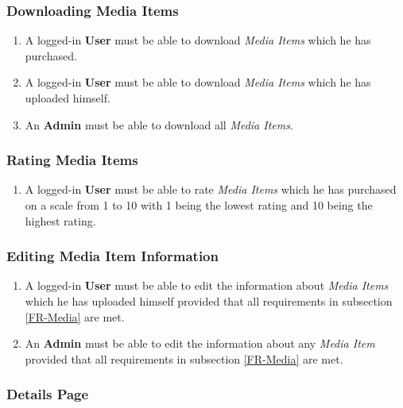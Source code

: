 \subsubsection {Downloading Media Items}

\begin{enumerate}[label=\textbf{FR-\twodigits*}, resume]
	\item A logged-in \textbf{User} must be able to download \textit{Media Items} which he has purchased.
	\item A logged-in \textbf{User} must be able to download \textit{Media Items} which he has uploaded himself.
	\item An \textbf{Admin} must be able to download all \textit{Media Items}.
\end{enumerate}
		
\subsubsection {Rating Media Items} \label{FR-RatingMedia}

\begin{enumerate}[label=\textbf{FR-\twodigits*}, resume]
	\item A logged-in \textbf{User} must be able to rate \textit{Media Items} which he has purchased on a scale from 1 to 10 with 1 being the lowest rating and 10 being the highest rating.
\end{enumerate}

\subsubsection{Editing Media Item Information}

\begin{enumerate}[label=\textbf{FR-\twodigits*}, resume]
	\item A logged-in \textbf{User} must be able to edit the information about \textit{Media Items} which he has uploaded himself provided that all requirements in subsection \ref{FR-Media} are met.
	\item An \textbf{Admin} must be able to edit the information about any \textit{Media Item} provided that all requirements in subsection \ref{FR-Media} are met.
\end{enumerate}
			
\subsubsection {Details Page}

